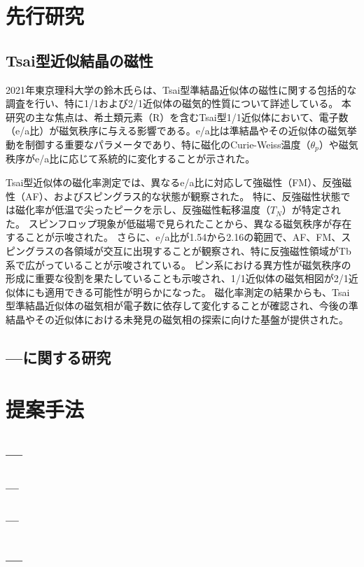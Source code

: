 \documentclass[11pt,a4j]{jreport}
\begin{document}
\chapter{先行研究}
\section{Tsai型近似結晶の磁性}
2021年東京理科大学の鈴木氏らは、Tsai型準結晶近似体の磁性に関する包括的な調査を行い、特に1/1および2/1近似体の磁気的性質について詳述している。
本研究の主な焦点は、希土類元素（R）を含むTsai型1/1近似体において、電子数（e/a比）が磁気秩序に与える影響である。e/a比は準結晶やその近似体の磁気挙動を制御する重要なパラメータであり、特に磁化のCurie-Weiss温度（$\theta_p$）や磁気秩序がe/a比に応じて系統的に変化することが示された。\par
Tsai型近似体の磁化率測定では、異なるe/a比に対応して強磁性（FM）、反強磁性（AF）、およびスピングラス的な状態が観察された。
特に、反強磁性状態では磁化率が低温で尖ったピークを示し、反強磁性転移温度（$T_N$）が特定された。
スピンフロップ現象が低磁場で見られたことから、異なる磁気秩序が存在することが示唆された。
さらに、e/a比が1.54から2.16の範囲で、AF、FM、スピングラスの各領域が交互に出現することが観察され、特に反強磁性領域がTb系で広がっていることが示唆されている。
ピン系における異方性が磁気秩序の形成に重要な役割を果たしていることも示唆され、1/1近似体の磁気相図が2/1近似体にも適用できる可能性が明らかになった。
磁化率測定の結果からも、Tsai型準結晶近似体の磁気相が電子数に依存して変化することが確認され、今後の準結晶やその近似体における未発見の磁気相の探索に向けた基盤が提供された。


\section{---に関する研究}

\chapter{提案手法}
\section{---}
\subsection{---}
\subsection{---}
\section{---}
\end{document}
